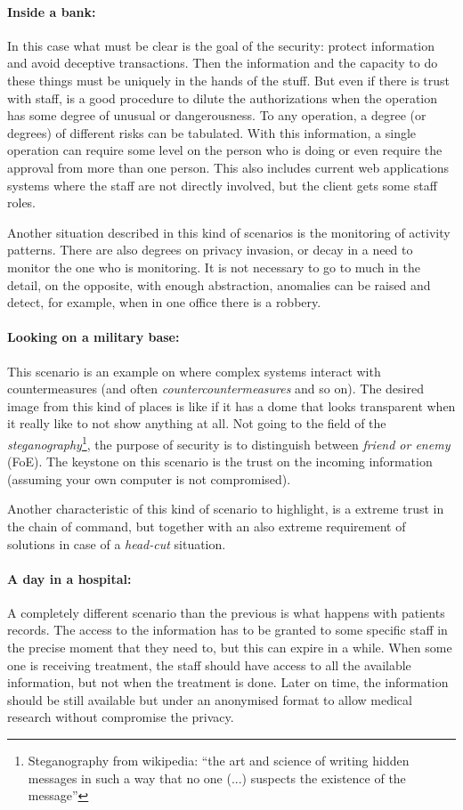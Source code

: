 \documentclass[10pt,a4paper,twoside]{llncs}
\begin{document}
\paragraph{Inside a bank:} In this case what must be clear is the goal of the security: protect information and avoid deceptive transactions. Then the information and the capacity to do these things must be uniquely in the hands of the stuff. But even if there is trust with staff, is a good procedure to dilute the authorizations when the operation has some degree of unusual or dangerousness. To any operation, a degree (or degrees) of different risks can be tabulated. With this information, a single operation can require some level on the person who is doing or even require the approval from more than one person. This also includes current web applications systems where the staff are not directly involved, but the client gets some staff roles.

Another situation described in this kind of scenarios is the monitoring of activity patterns. There are also degrees on privacy invasion, or decay in a need to monitor the one who is monitoring. It is not necessary to go to much in the detail, on the opposite, with enough abstraction, anomalies can be raised and detect, for example, when in one office there is a robbery.

\paragraph{Looking on a military base:} This scenario is an example on where complex systems interact with countermeasures (and often \emph{countercountermeasures} and so on). The desired image from this kind of places is like if it has a dome that looks transparent when it really like to not show anything at all. Not going to the field of the \emph{steganography}\footnote{Steganography from wikipedia: ``the art and science of writing hidden messages in such a way that no one (...) suspects the existence of the message''}, the purpose of security is to distinguish between \emph{friend or enemy} (FoE). The keystone on this scenario is the trust on the incoming information (assuming your own computer is not compromised).

Another characteristic of this kind of scenario to highlight, is a extreme trust in the chain of command, but together with an also extreme requirement of solutions in case of a \emph{head-cut} situation.

\paragraph{A day in a hospital:} A completely different scenario than the previous is what happens with patients records. The access to the information has to be granted to some specific staff in the precise moment that they need to, but this can expire in a while. When some one is receiving treatment, the staff should have access to all the available information, but not when the treatment is done. Later on time, the information should be still available but under an anonymised format to allow medical research without compromise the privacy.
\end{document}

